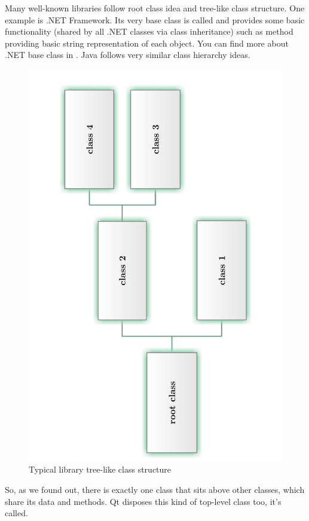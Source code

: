 \begin{fdocextra}
Many well-known libraries follow root class idea and tree-like class structure. One example is .NET Framework. Its very base class is called and provides some basic functionality (shared by all .NET classes via class inheritance) such as method providing basic string representation of each object. You can find more about .NET base class in \citep[p.~84]{nigel:csharp}. Java follows very similar class hierarchy ideas.
\end{fdocextra}

\begin{figure}[ht]
\centering
\includegraphics[angle=-90,width=12cm]{graphics/laboratory/02-tree.pdf}
\caption{Typical library tree-like class structure}\label{figure:library}
\end{figure}

So, as we found out, there is exactly one class that sits above other classes, which share its data and methods. Qt disposes this kind of top-level class too, it's called.
